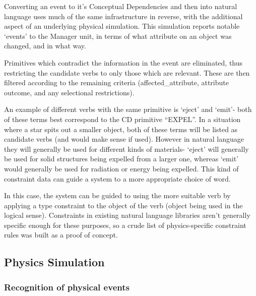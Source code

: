 \documentclass[dissertation.tex]{subfiles}
\begin{document}
    Converting an event to it's Conceptual Dependencies and then into natural language uses much of the same infrastructure in reverse, with the additional aspect of an underlying physical simulation. This simulation reports notable `events' to the Manager unit, in terms of what attribute on an object was changed, and in what way.

    Primitives which contradict the information in the event are eliminated, thus restricting the candidate verbs to only those which are relevant. These are then filtered according to the remaining criteria (affected\_attribute, attribute outcome, and any selectional restrictions).

    An example of different verbs with the same primitive is `eject' and `emit'- both of these terms best correspond to the CD primitive ``EXPEL''. In a situation where a star spits out a smaller object, both of these terms will be listed as candidate verbs (and would make sense if used). However in natural language they will generally be used for different kinds of materials- `eject' will generally be used for solid structures being expelled from a larger one, whereas `emit' would generally be used for radiation or energy being expelled. This kind of constraint data can guide a system to a more appropriate choice of word.

    In this case, the system can be guided to using the more suitable verb by applying a type constraint to the object of the verb (object being used in the logical sense). Constraints in existing natural language libraries aren't generally specific enough for these purposes, so a crude list of physics-specific constraint rules was built as a proof of concept.

    \subsection{Physics Simulation}
    \subsubsection{Recognition of physical events}

\end{document}
